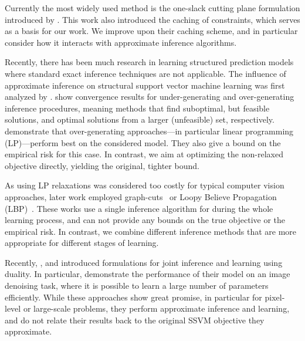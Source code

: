 Currently the most widely used method is the one-slack cutting plane formulation
introduced by \citet{joachims2009cutting}.
This work also introduced the caching of constraints,
which serves as a basis for our work. We improve upon their caching scheme, and in
particular consider how it interacts with approximate inference algorithms.

Recently, there has been much research in learning structured prediction models
where standard exact inference techniques are not applicable.
The influence of approximate inference on structural support vector machine
learning was first analyzed by  \citet{finley2008training}.
\citet{finley2008training} show convergence results for under-generating and
over-generating inference procedures, meaning methods that find suboptimal, but
feasible solutions, and optimal solutions from a larger (unfeasible) set,
respectively.
\citet{finley2008training} demonstrate that over-generating approaches---in
particular linear programming (LP)---perform best on the considered model.
They also give a bound on the empirical risk for this case.
In contrast, we aim at optimizing the non-relaxed objective directly, yielding
the original, tighter bound.

As using LP relaxations was considered too costly for typical computer vision
approaches, later work employed graph-cuts~\citep{szummer2008learning} or Loopy
Believe Propagation (LBP)~\citep{lucchi2011spatial}. These works use a single
inference algorithm for during the whole learning process, and can not provide any
bounds on the true objective or the empirical risk. In contrast, we combine
different inference methods that are more appropriate for different stages of
learning.

Recently, \citet{meshi2010learning}, \citet{hazan2010primal} and
\citet{komodakis2011efficient} introduced formulations for joint inference and
learning using duality.
In particular, \citet{hazan2010primal} demonstrate the performance of their
model on an image denoising task, where it is possible to learn a large number
of parameters efficiently.
While these approaches show great promise, in particular for pixel-level or
large-scale problems, they perform approximate inference and learning, and do
not relate their results back to the original SSVM objective they approximate.


